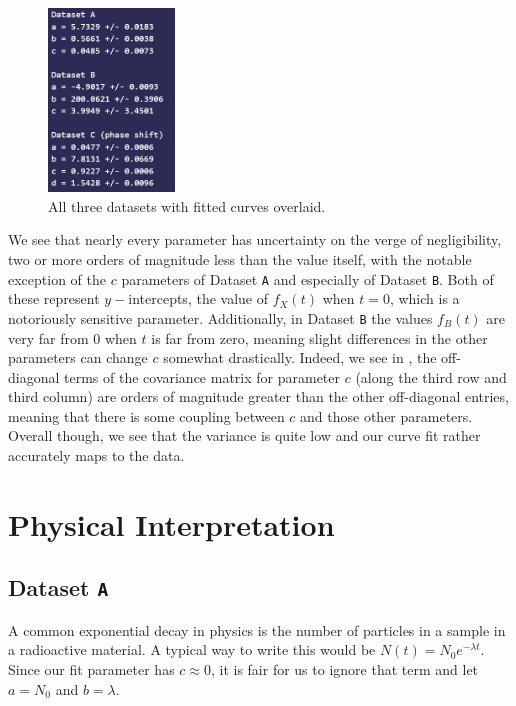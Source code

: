 \documentclass{article}
\begin{document}
\begin{figure}[ht]
    \centering

    \includegraphics[width=0.3\textwidth]{../figures/param_with_stddev.png}

    \caption{All three datasets with fitted curves overlaid.}

    \label{fig:fit_num}
\end{figure}

We see that nearly every parameter has uncertainty on the verge of negligibility, 
two or more orders of magnitude less than the value itself, with the notable
exception of the $c$ parameters of Dataset \verb|A| and especially of Dataset \verb|B|. Both of these
represent $y-$intercepts, the value of $f_X(t)$ when $t=0$, which is a notoriously sensitive
parameter. Additionally, in Dataset \verb|B| the values $f_B(t)$ are very far from 0 when $t$ is far
from zero, meaning slight differences in the other parameters can change $c$ somewhat drastically.
Indeed, we see in , the off-diagonal terms of the covariance
matrix for parameter $c$ (along the third row and third column) are orders of magnitude
greater than the other off-diagonal entries, meaning that there is some coupling between $c$ and
those other parameters. Overall though, we see that the variance is quite low and our curve fit
rather accurately maps to the data.

\section{Physical Interpretation}

\subsection{Dataset \texttt{A}}

A common exponential decay in physics is the number of particles in a sample in a radioactive material. 
A typical way to write this would be $N(t) = N_0e^{-\lambda t}$. Since our fit parameter has 
$c \approx 0$, it is fair for us to ignore that term and let $a = N_0$ and $b = \lambda$.
\end{document}
